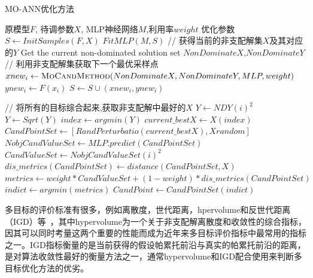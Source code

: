 \renewcommand{\algorithmicrequire}{\textbf{输入:}}
\renewcommand{\algorithmicensure}{\textbf{输出:}}
\begin{algorithm}
        \caption{MO-ANN优化方法}
        \begin{algorithmic}[1] %
            \Require 原模型$F$, 待调参数$X$, MLP神经网络$M$,利用率$weight$
            \Ensure 优化参数
            \State $S \gets InitSamples( F, X )$
                \State $FitMLP(M, S)$
                \State // 获得当前的非支配解集$X$及其对应的$Y$
                \State Get the current non-dominated solution set $NonDominateX$,$NonDominateY$   
                \State // 利用非支配解集获取下一个最优采样点
                \State $xnew_i \gets \Call {MoCandMethod}{NonDominateX,NonDominateY,MLP,weight}$
                \State $ynew_i \gets F(x_i)$
                \State $S \gets S \cup (xnew_i,ynew_i)$
            \EndFor
            
              \State // 将所有的目标综合起来,获取非支配解中最好的$X$
                  \State $Y \gets NDY(i)^2 $
              \EndFor
              \State $Y \gets Sqrt(Y)$
              \State $index \gets argmin(Y)$
              \State $current\_bestX \gets X(index)$ 
              \State $CandPointSet \gets [RandPerturbatio(current\_bestX),Xrandom]$
              \State $NobjCandValueSet \gets MLP.predict(CandPointSet)$
                  \State $CandValueSet \gets NobjCandValueSet(i)^2 $
              \EndFor 
              \State $dis\_metrics(CandPointSet) \gets distance(CandPointSet,X)$
              \State $metrics \gets weight * CandValueSet + (1-weight) * dis\_metrics(CandPointSet)$
              \State $indict \gets argmin(metrics)$
              \State $CandPoint \gets CandPointSet(indict)$
            \EndFunction
        \end{algorithmic}
\end{algorithm}

多目标的评价标准有很多，例如离散度，世代距离，hpervolume和反世代距离（IGD）等~\cite{riquelme2015performance}，其中hypervolume为一个关于非支配解离散度和收敛性的综合指标，因其可以同时考量这两个重要的性能而成为近年来多目标评价指标中最常用的指标之一。IGD指标衡量的是当前获得的假设帕累托前沿与真实的帕累托前沿的距离，是对算法收敛性最好的衡量方法之一，通常hypervolume和IGD配合使用来判断多目标优化方法的优劣。

